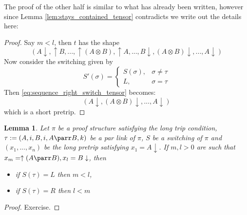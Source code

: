 \documentclass[12pt]{article}
\theoremstyle{plain}
\newtheorem{lemma}[thm]{Lemma}
\theoremstyle{definition}
\begin{document}
	The proof of the other half is similar to what has already been written, however since Lemma \ref{lem:stays_contained_tensor} contradicts \cite[Lemma 2.9.1]{linearlogic} we write out the details here:
	\begin{proof}
		Say $m < l$, then $t$ has the shape
		\begin{equation}\label{eq:sequence_right_switch_tensor}
			(A\downarrow, \uparrow B, ..., \uparrow (A \otimes B), \uparrow A, ..., B \downarrow, (A \otimes B)\downarrow, ..., A\downarrow)
		\end{equation}
		Now consider the switching given by
		\[
		S'(\sigma) = 
		\begin{cases}
			S(\sigma),& \sigma \neq \tau\\
			L, & \sigma = \tau
		\end{cases}
		\]
		Then \eqref{eq:sequence_right_switch_tensor} becomes:
		\begin{equation}
			(A\downarrow, (A \otimes B)\downarrow,..., A\downarrow)
		\end{equation}
		which is a short pretrip.
	\end{proof}
	\begin{lemma}\label{lem:stays_contained_par}
		Let $\pi$ be a proof structure satisfying the long trip condition, $\tau := (A,i,B,i,A\parr B, k)$ be a par link of $\pi$, $S$ be a switching of $\pi$ and $(x_1,...,x_n)$ be the long pretrip satisfying $x_1 = A\downarrow$. If $m,l > 0$ are such that $x_m = \uparrow (A \parr B), x_l = B\downarrow$, then
		\begin{itemize}
			\item if $S(\tau) = L$ then $m < l$,
			\item if $S(\tau) = R$ then $l < m$
		\end{itemize}
	\end{lemma}
	\begin{proof}
		Exercise.
	\end{proof}
\end{document}

